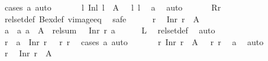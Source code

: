 \begin{isabellebody}
\ {\isacharparenleft}cases\ a{}{\isacharcomma}\ auto{\isacharparenright}\isanewline
\ \ \ \ \isamarkupfalse%
\ {\isachardoublequoteopen}{\isasymexists}\ l{}{\isachardot}\ Inl\ l{}\ {\isasymin}\ A{}\ {\isasymand}\ {\isasymchi}\ l{}\ l{}{\isachardoublequoteclose}\ \isamarkupfalse%
\ a{}\ \isamarkupfalse%
\ auto\isanewline
\ \ \isamarkupfalse%
\isanewline
\ \ \isamarkupfalse%
\ {\isacharquery}Rr\ \isamarkupfalse%
\ rel{\isacharunderscore}set{\isacharunderscore}def\ Bex{\isacharunderscore}def\ vimage{\isacharunderscore}eq\ \isamarkupfalse%
\ safe\isanewline
\ \ \ \ \isamarkupfalse%
\ r{}\ \isamarkupfalse%
\ {\isachardoublequoteopen}Inr\ r{}\ {\isasymin}\ A{}{\isachardoublequoteclose}\isanewline
\ \ \ \ \isamarkupfalse%
\ \isamarkupfalse%
\ a{}\ \ a{}{\isacharcolon}\ {\isachardoublequoteopen}a{}\ {\isasymin}\ A{}{\isachardoublequoteclose}\ \ {\isachardoublequoteopen}rel{\isacharunderscore}sum\ {\isasymchi}\ {\isasymphi}\ {\isacharparenleft}Inr\ r{}{\isacharparenright}\ a{}{\isachardoublequoteclose}\isanewline
\ \ \ \ \isamarkupfalse%
\ L\ \isamarkupfalse%
\ rel{\isacharunderscore}set{\isacharunderscore}def\ \isamarkupfalse%
\ auto\isanewline
\ \ \ \ \isamarkupfalse%
\ \isamarkupfalse%
\ r{}\ \ {\isachardoublequoteopen}a{}\ {\isacharequal}\ Inr\ r{}\ {\isasymand}\ {\isasymphi}\ r{}\ r{}{\isachardoublequoteclose}\ \isamarkupfalse%
\ {\isacharparenleft}cases\ a{}{\isacharcomma}\ auto{\isacharparenright}\isanewline
\ \ \ \ \isamarkupfalse%
\ {\isachardoublequoteopen}{\isasymexists}\ r{}{\isachardot}\ Inr\ r{}\ {\isasymin}\ A{}\ {\isasymand}\ {\isasymphi}\ r{}\ r{}{\isachardoublequoteclose}\ \isamarkupfalse%
\ a{}\ \isamarkupfalse%
\ auto\isanewline
\ \ \isamarkupfalse%
\isanewline
\ \ \ \ \isamarkupfalse%
\ r{}\ \isamarkupfalse%
\ {\isachardoublequoteopen}Inr\ r{}\ {\isasymin}\ A{}{\isachardoublequoteclose}\isanewline

\end{isabellebody}
